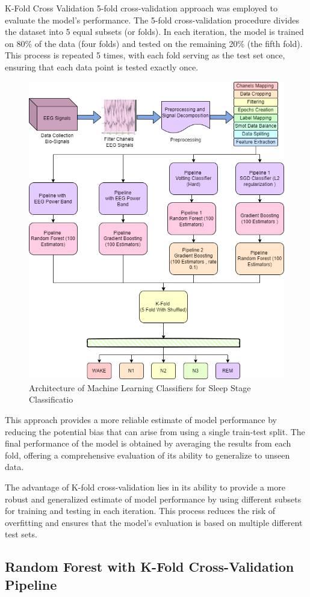 K-Fold Cross Validation  5-fold cross-validation approach was employed to evaluate the model's performance. The 5-fold cross-validation procedure divides the dataset into 5 equal subsets (or folds). In each iteration, the model is trained on 80\% of the data (four folds) and tested on the remaining 20\% (the fifth fold). This process is repeated 5 times, with each fold serving as the test set once, ensuring that each data point is tested exactly once.

\begin{figure}[H]
	\centering
	\includegraphics[width=0.6\linewidth]{"img/paper_1/k-FOLD.PNG"}
	\caption{Architecture of Machine Learning Classifiers for Sleep Stage
		Classificatio}
	\label{fig:architechture1}
\end{figure}







This approach provides a more reliable estimate of model performance by reducing the potential bias that can arise from using a single train-test split. The final performance of the model is obtained by averaging the results from each fold, offering a comprehensive evaluation of its ability to generalize to unseen data.

The advantage of K-fold cross-validation lies in its ability to provide a more robust and generalized estimate of model performance by using different subsets for training and testing in each iteration. This process reduces the risk of overfitting and ensures that the model's evaluation is based on multiple different test sets.

\subsection{Random Forest with K-Fold Cross-Validation Pipeline}

